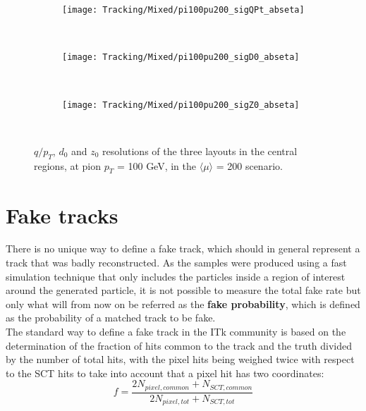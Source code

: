 \documentclass[a4paper,twoside,12pt]{book}
\begin{document}
\begin{figure}
\begin{subfigure}{\linewidth}
\texttt{[image: Tracking/Mixed/pi100pu200\_sigQPt\_abseta]}
\caption{}
\label{fig:tracking:pi100pu200_sigQPt_abseta_zoom}
\end{subfigure}\\[1ex]
\begin{subfigure}{\linewidth}
\texttt{[image: Tracking/Mixed/pi100pu200\_sigD0\_abseta]}
\caption{}
\label{fig:tracking:pi100pu200_sigD0_abseta_zoom}
\end{subfigure}\\[1ex]
\begin{subfigure}{\linewidth}
\texttt{[image: Tracking/Mixed/pi100pu200\_sigZ0\_abseta]}
\caption{}
\label{fig:tracking:pi100pu200_sigZ0_abseta_zoom}
\end{subfigure}\\[1ex]
\caption{$q/p_{T}$, $d_{0}$ and $z_{0}$ resolutions of the three layouts in the central regions, at pion $p_{T}$ = 100 GeV, in the $\langle\mu\rangle$ = 200 scenario.}
\label{fig:tracking:pt100resolutions_zoom}
\end{figure}


\section{Fake tracks}
There is no unique way to define a fake track, which should in general represent a track that was badly reconstructed. As the samples were produced using a fast simulation technique that
only includes the particles inside a region of interest around the generated particle, it is not possible to measure the total fake rate but only what will from now on be referred
as the \textbf{fake probability}, which is defined as the probability of a matched track to be fake. \\

The standard way to define a fake track in the ITk community is based on the determination of
 the fraction of hits common to the track and the truth divided by the number of total hits, with the pixel hits being weighed twice with respect to the SCT hits to take into account that a pixel hit has two coordinates: \\
$$
f = \frac{2N_{pixel, common} + N_{SCT, common}}{2N_{pixel, tot} + N_{SCT, tot}}
$$
\end{document}
